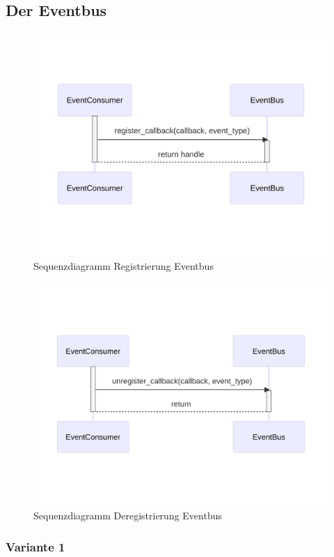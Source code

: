 \subsection{Der Eventbus}

\cite{noauthor_signals_nodate}
\citeauthor{persitzky_fehlerinjektion_2023}

\begin{figure}[!hb]
	\centering
	\includegraphics[width=0.75\linewidth]{images/diagrams/eventbus-register-seq.png}
	\caption{Sequenzdiagramm Registrierung Eventbus}
	\label{fig:eventbus-register-seq}
\end{figure}

\begin{figure}[!hb]
	\centering
	\includegraphics[width=0.75\linewidth]{images/diagrams/eventbus-unregister-seq.png}
	\caption{Sequenzdiagramm Deregistrierung Eventbus}
	\label{fig:eventbus-unregister-seq}
\end{figure}

\subsubsection*{Variante 1}

